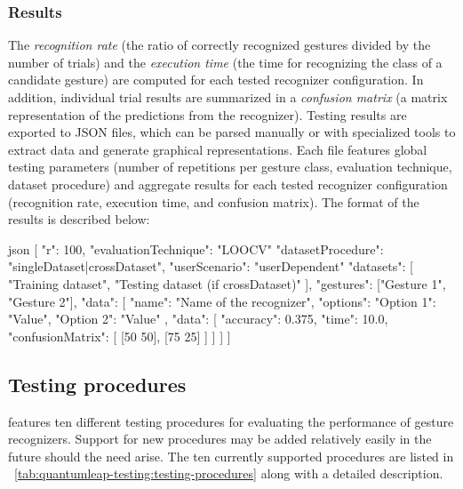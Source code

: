 \subsubsection{Results} \label{sec:quantumleap-testing:description:ql-integration:results}
The \textit{recognition rate} (\ie the ratio of correctly recognized gestures divided by the number of trials) and the \textit{execution time} (\ie the time for recognizing the class of a candidate gesture) are computed for each tested recognizer configuration. In addition, individual trial results are summarized in a \textit{confusion matrix} (\ie a matrix representation of the predictions from the recognizer). 
Testing results are exported to JSON files, which can be parsed manually or with specialized tools to extract data and generate graphical representations. Each file features global testing parameters (\eg number of repetitions per gesture class, evaluation technique, dataset procedure) and aggregate results for each tested recognizer configuration (recognition rate, execution time, and confusion matrix). The format of the results is described below:

\begin{customcodeblock}[]{json}
[
  {
    "r": 100,
    "evaluationTechnique": "LOOCV"
    "datasetProcedure": "singleDataset|crossDataset",
    "userScenario": "userDependent"
    "datasets": [
      "Training dataset", 
      "Testing dataset (if crossDataset)"
    ],
    "gestures": ["Gesture 1", "Gesture 2"],
    "data": [
      {
        "name": "Name of the recognizer",
        "options": {
          "Option 1": "Value",
          "Option 2": "Value"
        },
        "data": [
          {
            "accuracy": 0.375,
            "time": 10.0,
            "confusionMatrix": [
              [50 50],
              [75 25]
            ]
          }
        ]
      }
    ]
  }
]
\end{customcodeblock}

\subsection{Testing procedures} \label{sec:quantumleap-testing:description:testing-procedures}
\ql features ten different testing procedures for evaluating the performance of gesture recognizers. Support for new procedures may be added relatively easily in the future should the need arise. The ten currently supported procedures are listed in \tab~\ref{tab:quantumleap-testing:testing-procedures} along with a detailed description. 

